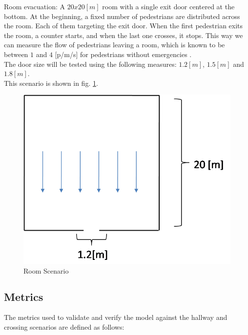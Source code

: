 \documentclass[english]{article}
\begin{document}
        Room evacuation: A $20x20[m]$ room with a single exit door
        centered at the bottom. At the beginning, a fixed number of pedestrians are 
        distributed across the room. Each of them targeting the exit door. When the 
        first pedestrian exits the room, a counter starts, and when the last one 
        crosses, it stops. This way we can measure the flow of pedestrians leaving a 
        room, which is known to be between $1$ and $4$ [p/m/s] for pedestrians 
        without emergencies \cite{key-pari2009}. \\
        The door size will be tested using the following measures: $1.2[m]$, $1.5[m]$ and $1.8[m]$. \\
        This scenario is shown in fig. \ref{fig:room}.
        \begin{figure}[H]
            \centering{}
            \includegraphics[scale=0.3]{pics/scenarios/room}
            \caption{\label{fig:room} Room Scenario}
        \end{figure}
    
    \subsection{Metrics}
        The metrics used to validate and verify the model against the hallway and 
        crossing scenarios are defined as follows:
        
\end{document}
